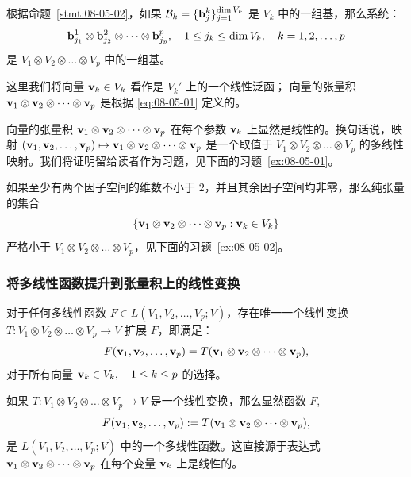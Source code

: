\begin{remark}\label{stmt:08-05-03}
根据命题~\ref{stmt:08-05-02}，如果 $\mathcal{B}_k = \{\mathbf{b}^{k}_{j}\}_{j=1}^{\dim V_k}$ 是 $V_k$ 中的一组基，那么系统：
\begin{equation}\label{eq:08-05-05}
\mathbf{b}^{1}_{j_1} \otimes \mathbf{b}^{2}_{j_2} \otimes \dots \otimes \mathbf{b}^{p}_{j_p}, \quad 1 \le j_k \le \dim V_k, \quad k = 1, 2, \dots, p
\end{equation}
是 $V_1 \otimes V_2 \otimes \dots \otimes V_p$ 中的一组基。
\end{remark}

这里我们将向量 $\mathbf{v}_k \in V_k$ 看作是 $V_k'$ 上的一个线性泛函；
向量的张量积 $\mathbf{v}_1 \otimes \mathbf{v}_2 \otimes \dots \otimes \mathbf{v}_p$ 是根据 \eqref{eq:08-05-01} 定义的。

\begin{remark*}
向量的张量积 $\mathbf{v}_1 \otimes \mathbf{v}_2 \otimes \dots \otimes \mathbf{v}_p$ 在每个参数 $\mathbf{v}_k$ 上显然是线性的。换句话说，映射 $(\mathbf{v}_1, \mathbf{v}_2, \dots, \mathbf{v}_p) \mapsto \mathbf{v}_1 \otimes \mathbf{v}_2 \otimes \dots \otimes \mathbf{v}_p$ 是一个取值于 $V_1 \otimes V_2 \otimes \dots \otimes V_p$ 的多线性映射。我们将证明留给读者作为习题，见下面的习题~\ref{ex:08-05-01}。
\end{remark*}

\begin{remark*}
如果至少有两个因子空间的维数不小于 $2$，并且其余因子空间均非零，那么纯张量的集合
$$\{\mathbf{v}_1 \otimes \mathbf{v}_2 \otimes \dots \otimes \mathbf{v}_p : \mathbf{v}_k \in V_k\}$$
严格小于 $V_1 \otimes V_2 \otimes \dots \otimes V_p$，见下面的习题~\ref{ex:08-05-02}。
\end{remark*}

\subsubsection{将多线性函数提升到张量积上的线性变换}\label{sec:08-05-02-01}

\begin{proposition}\label{stmt:08-05-04}
对于任何多线性函数 $F \in L(V_1, V_2, \dots, V_p; V)$，存在唯一一个线性变换 $T : V_1 \otimes V_2 \otimes \dots \otimes V_p \to V$ 扩展 $F$，即满足：
\begin{equation}\label{eq:08-05-06}
F(\mathbf{v}_1, \mathbf{v}_2, \dots, \mathbf{v}_p) = T(\mathbf{v}_1 \otimes \mathbf{v}_2 \otimes \dots \otimes \mathbf{v}_p),
\end{equation}
对于所有向量 $\mathbf{v}_k \in V_k,\quad 1 \le k \le p$ 的选择。
\end{proposition}

\begin{remark*}
如果 $T : V_1 \otimes V_2 \otimes \dots \otimes V_p \to V$ 是一个线性变换，那么显然函数 $F$,
$$F(\mathbf{v}_1, \mathbf{v}_2, \dots, \mathbf{v}_p) := T(\mathbf{v}_1 \otimes \mathbf{v}_2 \otimes \dots \otimes \mathbf{v}_p),$$
是 $L(V_1, V_2, \dots, V_p; V)$ 中的一个多线性函数。这直接源于表达式 $\mathbf{v}_1 \otimes \mathbf{v}_2 \otimes \dots \otimes \mathbf{v}_p$ 在每个变量 $\mathbf{v}_k$ 上是线性的。
\end{remark*}


